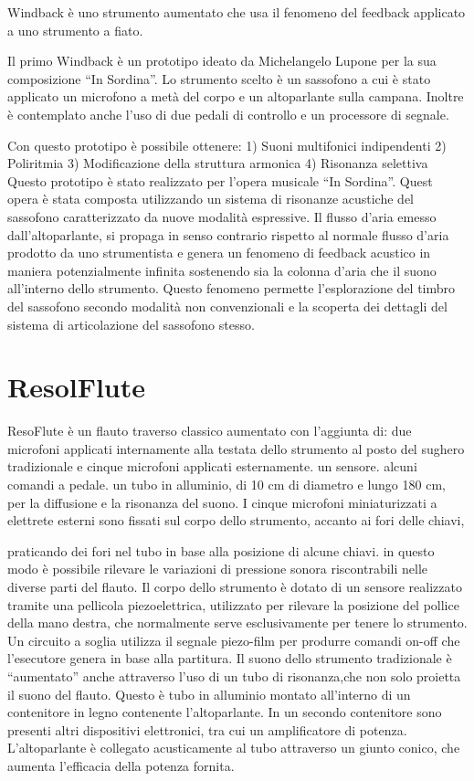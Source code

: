 Windback è uno strumento aumentato che usa il fenomeno del feedback applicato a
uno strumento a fiato.

Il primo Windback è un prototipo ideato da Michelangelo Lupone per la sua
composizione “In Sordina”.
Lo strumento scelto è un sassofono a cui è stato applicato un microfono a metà
del corpo e un altoparlante sulla campana.
Inoltre è contemplato anche l’uso di due pedali di controllo e un processore di
segnale.

Con questo prototipo è possibile ottenere:
1) Suoni multifonici indipendenti
2) Poliritmia
3) Modificazione della struttura armonica
4) Risonanza selettiva
Questo prototipo è stato realizzato per l’opera musicale “In Sordina”.
Quest opera è stata composta utilizzando un sistema di risonanze acustiche del
sassofono caratterizzato da nuove modalità espressive.
Il flusso d’aria emesso dall’altoparlante, si propaga in senso contrario rispetto
al normale flusso d’aria prodotto da uno strumentista e genera un fenomeno di
feedback acustico in maniera potenzialmente infinita sostenendo sia la colonna
d’aria che il suono all’interno dello strumento.
Questo fenomeno permette l’esplorazione  del timbro del sassofono secondo
modalità non convenzionali e la scoperta dei dettagli del sistema di articolazione
del sassofono stesso.

\section{ResolFlute}

ResoFlute è un flauto traverso classico aumentato con l’aggiunta di:
due microfoni applicati internamente alla testata dello strumento al posto del
sughero tradizionale e cinque microfoni applicati esternamente.
un sensore.
alcuni comandi a pedale.
un tubo in alluminio, di 10 cm di diametro e lungo 180 cm, per la diffusione e
la risonanza del suono.
I cinque microfoni miniaturizzati a elettrete esterni sono fissati sul corpo
dello strumento, accanto ai fori delle chiavi,

praticando dei fori nel tubo in base alla posizione di alcune chiavi.  in questo
modo è possibile rilevare le variazioni di pressione sonora riscontrabili nelle
diverse parti del flauto.
Il corpo dello strumento è dotato di un sensore realizzato tramite una pellicola
piezoelettrica,  utilizzato per rilevare la posizione del pollice della mano
destra, che normalmente serve esclusivamente per tenere lo strumento.
Un circuito a soglia utilizza il segnale piezo-film  per produrre comandi on-off
che l'esecutore genera in base alla partitura.
Il suono dello strumento tradizionale è “aumentato” anche attraverso l'uso di un
tubo di risonanza,che non solo proietta il suono del flauto. Questo è  tubo in
alluminio montato all'interno di un contenitore in legno contenente l'altoparlante.
In un secondo contenitore sono presenti altri dispositivi elettronici, tra cui un
amplificatore di potenza. L'altoparlante è collegato acusticamente al tubo
attraverso un giunto conico, che aumenta l’efficacia della potenza fornita.

